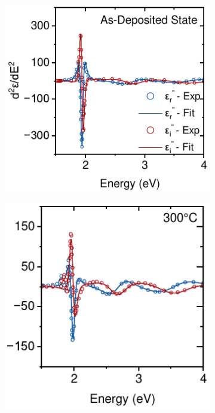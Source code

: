 \begin{figure}[ht!]
    \centering
    \begin{subfigure}{0.34\textwidth}
        \includegraphics[width=\textwidth]{chapters/ellipsometry/image/Deriv_As_Dep.pdf}
        \caption{}
        \label{fig:ellipsometry:deriv:As_dep}
    \end{subfigure}
    \hfill
    \begin{subfigure}{0.31\textwidth}
        \includegraphics[width=\textwidth]{chapters/ellipsometry/image/Deriv_300C.pdf}

\end{subfigure}
\end{figure}
